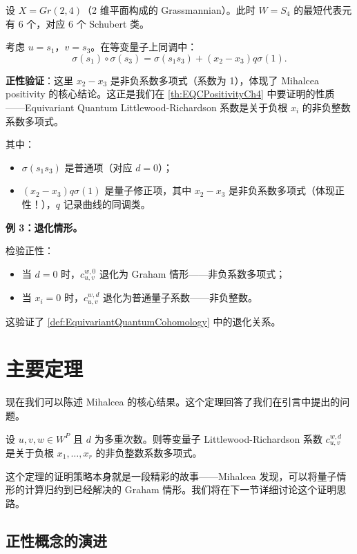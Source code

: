 设 $X = Gr(2,4)$（2 维平面构成的 Grassmannian）。此时 $W = S_4$ 的最短代表元有 6 个，对应 6 个 Schubert 类。

考虑 $u = s_1$，$v = s_3$。在等变量子上同调中：
$$\sigma(s_1) \circ \sigma(s_3) = \sigma(s_1 s_3) + (x_2 - x_3) q \sigma(1).$$

\textbf{正性验证}：这里 $x_2 - x_3$ 是非负系数多项式（系数为 1），体现了 Mihalcea positivity 的核心结论。这正是我们在 \cref{th:EQCPositivityCh4} 中要证明的性质——Equivariant Quantum Littlewood-Richardson 系数是关于负根 $x_i$ 的非负整数系数多项式。

其中：
\begin{itemize}
\item $\sigma(s_1 s_3)$ 是普通项（对应 $d = 0$）；
\item $(x_2 - x_3) q \sigma(1)$ 是量子修正项，其中 $x_2 - x_3$ 是非负系数多项式（体现正性！），$q$ 记录曲线的同调类。
\end{itemize}

\textbf{例 3：退化情形。}

检验正性：
\begin{itemize}
\item 当 $d = 0$ 时，$c_{u,v}^{w,0}$ 退化为 Graham 情形——非负系数多项式；
\item 当 $x_i = 0$ 时，$c_{u,v}^{w,d}$ 退化为普通量子系数——非负整数。
\end{itemize}

这验证了 \cref{def:EquivariantQuantumCohomology} 中的退化关系。

\section{主要定理}
\label{sec:MainTheoremCh4}

现在我们可以陈述 Mihalcea 的核心结果。这个定理回答了我们在引言中提出的问题。

\begin{Theorem}
\label{th:EQCPositivityCh4}
设 $u, v, w \in W^P$ 且 $d$ 为多重次数。则等变量子 Littlewood-Richardson 系数 $c_{u,v}^{w,d}$ 是关于负根 $x_1, \ldots, x_r$ 的非负整数系数多项式。
\end{Theorem}

这个定理的证明策略本身就是一段精彩的故事——Mihalcea 发现，可以将量子情形的计算归约到已经解决的 Graham 情形。我们将在下一节详细讨论这个证明思路。

\subsection{正性概念的演进}

